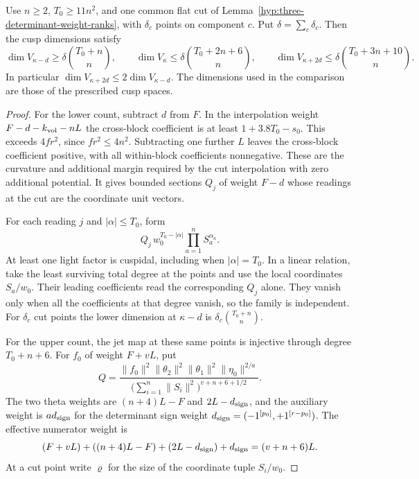 \begin{proposition}
\label{prop:three-selected-weight-ranks}
Use \(n\ge2\), \(T_0\ge11n^2\), and one common flat cut
of Lemma~\ref{hyp:three-determinant-weight-ranks}, with
\(\delta_c\) points on component \(c\). Put
\(\delta=\sum_c\delta_c\). Then the cusp dimensions satisfy
\[
 \dim V_{\kappa-d}\ge\delta\binom{T_0+n}{n},\qquad
 \dim V_{\kappa}\le\delta\binom{T_0+2n+6}{n},\qquad
 \dim V_{\kappa+2d}\le\delta\binom{T_0+3n+10}{n}.
\]
In particular \(\dim V_{\kappa+2d}\le 2\dim V_{\kappa-d}\). The dimensions used in the comparison
are those of the prescribed cusp spaces.
\end{proposition}

\begin{proof}
For the lower count, subtract $d$ from $F$. In the interpolation
weight $F-d-k_{\rm vol}-nL$ the cross-block coefficient is at least
$1+3.8T_0-s_0$. This exceeds $4fr^2$, since $fr^2\le4n^2$.
Subtracting one further $L$ leaves the cross-block coefficient
positive, with all within-block coefficients nonnegative. These
are the curvature and additional margin required by the cut
interpolation with zero additional potential. It gives bounded
sections $Q_j$ of weight $F-d$ whose readings at the cut are the
coordinate unit vectors.

For each reading $j$ and $|\alpha|\le T_0$,
form
\[
   Q_j\,w_0^{T_0-|\alpha|}\prod_{a=1}^n S_a^{\alpha_a}.
\]
At least one light factor is cuspidal, including when $|\alpha|=T_0$.
In a linear relation, take the least surviving total degree at the
points and use the local coordinates $S_a/w_0$. Their leading
coefficients read the corresponding $Q_j$ alone. They vanish only
when all the coefficients at that degree vanish, so the family is
independent. For $\delta_c$ cut points the lower dimension at
$\kappa-d$ is $\delta_c\binom{T_0+n}{n}$.
\label{cor:paired-cusp-ranks-8}

For the upper count, the jet map at these same points is injective
through degree $T_0+n+6$. For \(f_0\) of weight \(F+vL\), put
\[
 Q=\frac{\|f_0\|^2\|\theta_2\|^2\|\theta_1\|^2\|\eta_0\|^{2/a}}
        {\big(\sum_{i=1}^n\|S_i\|^2\big)^{v+n+6+1/2}}.
\]
The two theta weights are $(n+4)L-F$ and $2L-d_{\rm sign}$,
and the auxiliary weight is $a d_{\rm sign}$ for the determinant
sign weight $d_{\rm sign}=(-1^{[p_0]},+1^{[r-p_0]})$.
The effective numerator weight is
\[
 (F+vL)+((n+4)L-F)+(2L-d_{\rm sign})+d_{\rm sign}
               =(v+n+6)L .
\]
At a cut point write \(\varrho\) for the size of the coordinate
tuple \(S_i/w_0\).


\end{proof}
